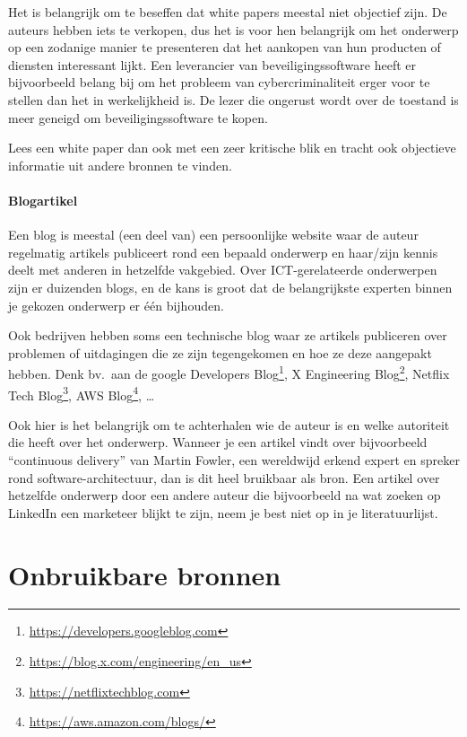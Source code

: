 Het is belangrijk om te beseffen dat white papers meestal niet objectief zijn. De auteurs hebben iets te verkopen, dus het is voor hen belangrijk om het onderwerp op een zodanige manier te presenteren dat het aankopen van hun producten of diensten interessant lijkt. Een leverancier van beveiligingssoftware heeft er bijvoorbeeld belang bij om het probleem van cybercriminaliteit erger voor te stellen dan het in werkelijkheid is. De lezer die ongerust wordt over de toestand is meer geneigd om beveiligingssoftware te kopen.

Lees een white paper dan ook met een zeer kritische blik en tracht ook objectieve informatie uit andere bronnen te vinden.

\paragraph{Blogartikel}

Een blog is meestal (een deel van) een persoonlijke website waar de auteur regelmatig artikels publiceert rond een bepaald onderwerp en haar/zijn kennis deelt met anderen in hetzelfde vakgebied. Over ICT-gerelateerde onderwerpen zijn er duizenden blogs, en de kans is groot dat de belangrijkste experten binnen je gekozen onderwerp er één bijhouden.

Ook bedrijven hebben soms een technische blog waar ze artikels publiceren over problemen of uitdagingen die ze zijn tegengekomen en hoe ze deze aangepakt hebben. Denk bv.\ aan de google Developers Blog\footnote{\url{https://developers.googleblog.com}}, X Engineering Blog\footnote{\url{https://blog.x.com/engineering/en_us}}, Netflix Tech Blog\footnote{\url{https://netflixtechblog.com}}, AWS Blog\footnote{\url{https://aws.amazon.com/blogs/}}, \dots

Ook hier is het belangrijk om te achterhalen wie de auteur is en welke autoriteit die heeft over het onderwerp. Wanneer je een artikel vindt over bijvoorbeeld ``continuous delivery'' van Martin Fowler, een wereldwijd erkend expert en spreker rond software-architectuur, dan is dit heel bruikbaar als bron. Een artikel over hetzelfde onderwerp door een andere auteur die bijvoorbeeld na wat zoeken op LinkedIn een marketeer blijkt te zijn, neem je best niet op in je literatuurlijst.

\section{Onbruikbare bronnen}%
\label{sec:onbruikbare-bronnen}

